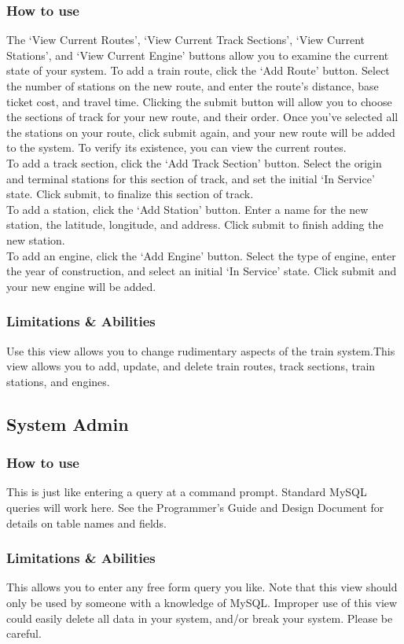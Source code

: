\documentclass[letter]{article}
\begin{document}
\subsubsection{How to use}
The `View Current Routes', `View Current Track Sections', `View Current Stations', and `View Current Engine' buttons allow you to examine the current state of your system.
To add a train route, click the `Add Route' button. Select the number of stations on the new route, and enter the route's distance, base ticket cost, and travel time. Clicking the submit button will allow you to choose the sections of track for your new route, and their order. Once you've selected all the stations on your route, click submit again, and your new route will be added to the system. To verify its existence, you can view the current routes.\\
To add a track section, click the `Add Track Section' button. Select the origin and terminal stations for this section of track, and set the initial `In Service' state. Click submit, to finalize this section of track. \\
To add a station, click the `Add Station' button. Enter a name for the new station, the latitude, longitude, and address. Click submit to finish adding the new station. \\
To add an engine, click the `Add Engine' button. Select the type of engine, enter the year of construction, and select an initial `In Service' state. Click submit and your new engine will be added.
\subsubsection{Limitations \& Abilities}
Use this view allows you to change rudimentary aspects of the train system.This view allows you to add, update, and delete train routes, track sections, train stations, and engines.


\subsection{System Admin}
\subsubsection{How to use}
This is just like entering a query at a command prompt. Standard MySQL queries will work here. See the Programmer's Guide and Design Document for details on table names and fields.

\subsubsection{Limitations \& Abilities}
This allows you to enter any free form query you like. Note that this view should only be used by someone with a knowledge of MySQL. Improper use of this view could easily delete all data in your system, and/or break your system. Please be careful.


\end{document}
